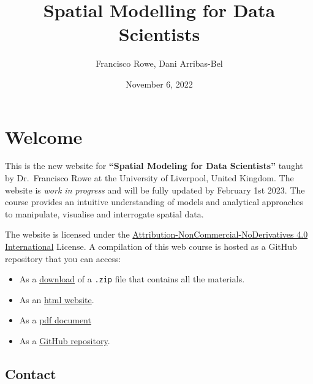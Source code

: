 \documentclass[
  letterpaper,
  DIV=11,
  numbers=noendperiod]{scrreprt}
\title{Spatial Modelling for Data Scientists}
\author{Francisco Rowe, Dani Arribas-Bel}
\date{November 6, 2022}
\providecommand{\tightlist}{%
  \setlength{\itemsep}{0pt}\setlength{\parskip}{0pt}}\usepackage{longtable,booktabs,array}
\renewcommand*\contentsname{Table of contents}
\newcommand\contentsname{Table of contents}
\begin{document}
\maketitle
\ifdefined\Shaded\renewenvironment{Shaded}{\begin{tcolorbox}[sharp corners, interior hidden, borderline west={3pt}{0pt}{shadecolor}, enhanced, frame hidden, breakable, boxrule=0pt]}{\end{tcolorbox}}\fi

\renewcommand*\contentsname{Table of contents}
{
\hypersetup{linkcolor=}
\setcounter{tocdepth}{2}
\tableofcontents
}

\hypertarget{welcome}{%
\chapter*{Welcome}\label{welcome}}

This is the new website for \textbf{``Spatial Modeling for Data
Scientists''} taught by Dr.~Francisco Rowe at the University of
Liverpool, United Kingdom. The website is \emph{work in progress} and
will be fully updated by February 1st 2023. The course provides an
intuitive understanding of models and analytical approaches to
manipulate, visualise and interrogate spatial data.

The website is licensed under the
\href{https://creativecommons.org/licenses/by-nc-nd/4.0/}{Attribution-NonCommercial-NoDerivatives
4.0 International} License. A compilation of this web course is hosted
as a GitHub repository that you can access:

\begin{itemize}
\tightlist
\item
  As a
  \href{https://github.com/fcorowe/smds/archive/refs/heads/main.zip}{download}
  of a \texttt{.zip} file that contains all the materials.
\item
  As an \href{}{html website}.
\item
  As a \href{}{pdf document}
\item
  As a \href{https://github.com/fcorowe/smds}{GitHub repository}.
\end{itemize}

\hypertarget{contact}{%
\section*{Contact}\label{contact}}
\end{document}
